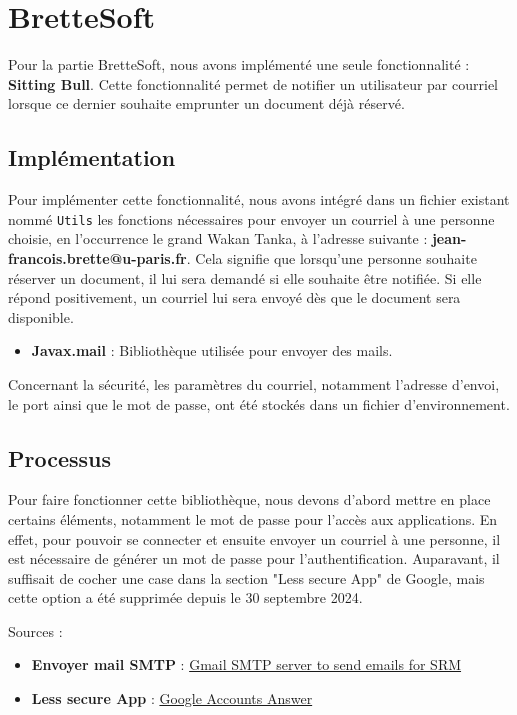 \chapter{BretteSoft}

Pour la partie BretteSoft, nous avons implémenté une seule fonctionnalité : \textbf{Sitting Bull}.
Cette fonctionnalité permet de notifier un utilisateur par courriel lorsque ce dernier souhaite emprunter un document déjà réservé.


\section{Implémentation}

Pour implémenter cette fonctionnalité, nous avons intégré dans un fichier existant nommé \texttt{Utils} les fonctions nécessaires pour envoyer un courriel à une personne choisie, en l'occurrence le grand Wakan Tanka, à l'adresse suivante : \textbf{jean-francois.brette@u-paris.fr}. Cela signifie que lorsqu'une personne souhaite réserver un document, il lui sera demandé si elle souhaite être notifiée. Si elle répond positivement, un courriel lui sera envoyé dès que le document sera disponible.

\begin{itemize}
    \item \textbf{Javax.mail} : Bibliothèque utilisée pour envoyer des mails.
\end{itemize}

Concernant la sécurité, les paramètres du courriel, notamment l'adresse d'envoi, le port ainsi que le mot de passe, ont été stockés dans un fichier d'environnement.


\section{Processus}

Pour faire fonctionner cette bibliothèque, nous devons d'abord mettre en place certains éléments, notamment le mot de passe pour l'accès aux applications. En effet, pour pouvoir se connecter et ensuite envoyer un courriel à une personne, il est nécessaire de générer un mot de passe pour l'authentification. Auparavant, il suffisait de cocher une case dans la section "Less secure App" de Google, mais cette option a été supprimée depuis le 30 septembre 2024.

Sources :

\begin{itemize}
    \item \textbf{Envoyer mail SMTP} : \href{https://kb.synology.com/fr-fr/SRM/tutorial/How_to_use_Gmail_SMTP_server_to_send_emails_for_SRM}{Gmail SMTP server to send emails for SRM}
    \item \textbf{Less secure App} : \href{https://support.google.com/accounts/answer/6010255?sjid=6174101903992956370-EU}{Google Accounts Answer}
\end{itemize}


